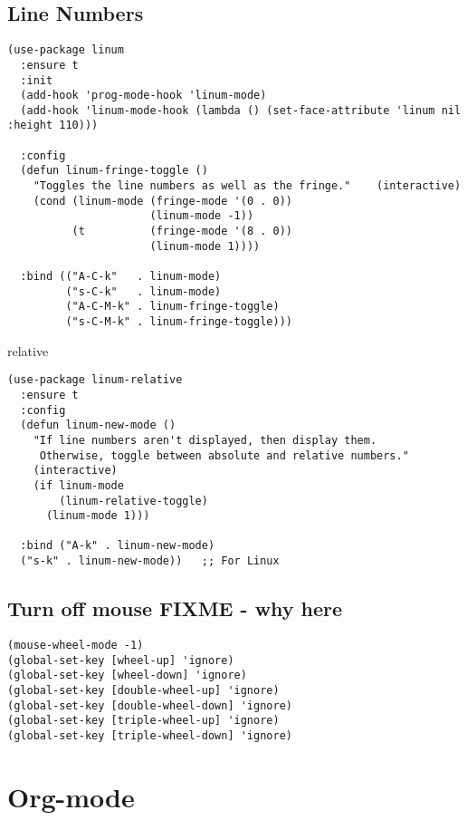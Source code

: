 \documentclass[12pt]{article}
\begin{document}
\subsection{Line Numbers}
\label{sec-4-5}


\lstset{language=Lisp,label= ,caption= ,numbers=none}
\begin{lstlisting}
(use-package linum
  :ensure t
  :init
  (add-hook 'prog-mode-hook 'linum-mode)
  (add-hook 'linum-mode-hook (lambda () (set-face-attribute 'linum nil :height 110)))

  :config
  (defun linum-fringe-toggle ()
    "Toggles the line numbers as well as the fringe."    (interactive)
    (cond (linum-mode (fringe-mode '(0 . 0))
                      (linum-mode -1))
          (t          (fringe-mode '(8 . 0))
                      (linum-mode 1))))

  :bind (("A-C-k"   . linum-mode)
         ("s-C-k"   . linum-mode)
         ("A-C-M-k" . linum-fringe-toggle)
         ("s-C-M-k" . linum-fringe-toggle)))
\end{lstlisting}


relative
\lstset{language=Lisp,label= ,caption= ,numbers=none}
\begin{lstlisting}
(use-package linum-relative
  :ensure t
  :config
  (defun linum-new-mode ()
    "If line numbers aren't displayed, then display them.
     Otherwise, toggle between absolute and relative numbers."
    (interactive)
    (if linum-mode
        (linum-relative-toggle)
      (linum-mode 1)))

  :bind ("A-k" . linum-new-mode)
  ("s-k" . linum-new-mode))   ;; For Linux
\end{lstlisting}

\subsection{Turn off mouse FIXME - why here}
\label{sec-4-6}

\lstset{language=Lisp,label= ,caption= ,numbers=none}
\begin{lstlisting}
(mouse-wheel-mode -1)
(global-set-key [wheel-up] 'ignore)
(global-set-key [wheel-down] 'ignore)
(global-set-key [double-wheel-up] 'ignore)
(global-set-key [double-wheel-down] 'ignore)
(global-set-key [triple-wheel-up] 'ignore)
(global-set-key [triple-wheel-down] 'ignore)
\end{lstlisting}

\section{Org-mode}
\label{sec-5}
\end{document}
